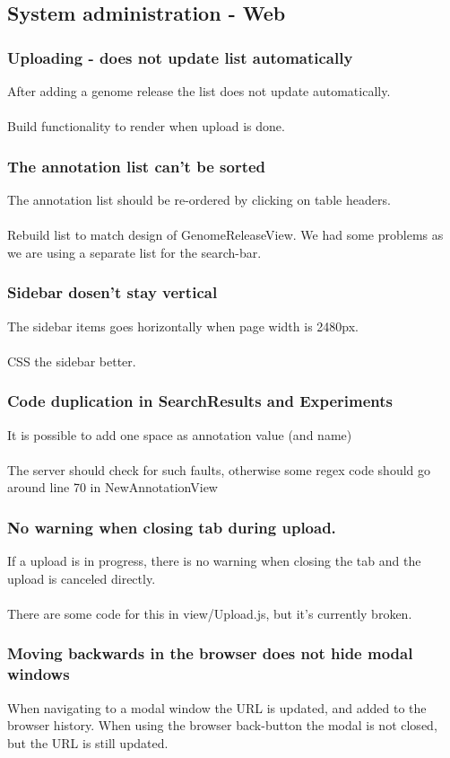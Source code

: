 \subsection{System administration - Web}
\subsubsection{Uploading - does not update list automatically}
After adding a genome release the list does not update automatically. \\
\\
Build functionality to render when upload is done. 
\subsubsection{The annotation list can't be sorted}
The annotation list should be re-ordered by clicking on table headers. \\
\\
Rebuild list to match design of GenomeReleaseView. We had some problems as we are using a separate list for the search-bar.
\subsubsection{Sidebar dosen't stay vertical}
The sidebar items goes horizontally when page width is 2480px. \\
\\
CSS the sidebar better. 
\subsubsection{Code duplication in SearchResults and Experiments}
It is possible to add one space as annotation value (and name) \\
\\
The server should check for such faults, otherwise some regex code should go around line 70 in NewAnnotationView
\subsubsection{No warning when closing tab during upload.}
If a upload is in progress, there is no warning when closing the tab and the upload is canceled directly. \\
\\
There are some code for this in view/Upload.js, but it's currently broken.
\subsubsection{Moving backwards in the browser does not hide modal windows}
When navigating to a modal window the URL is updated, and added to the browser history. When using the browser back-button the modal is not closed, but the URL is still updated. \\
\\

